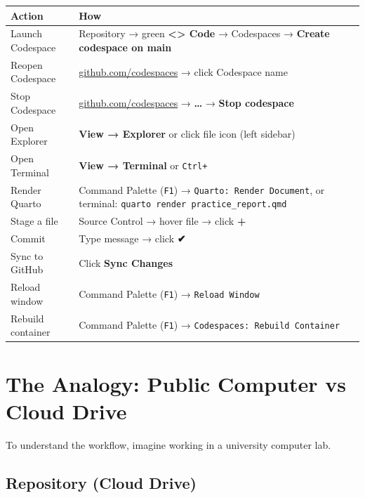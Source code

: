 \documentclass[
  letterpaper,
  DIV=11,
  numbers=noendperiod,
  oneside]{scrreprt}
\begin{document}
\begin{longtable}[]{@{}
  >{\raggedright\arraybackslash}p{}
  >{\raggedright\arraybackslash}p{}@{}}
\toprule\noalign{}
\begin{minipage}[b]{\linewidth}\raggedright
Action
\end{minipage} & \begin{minipage}[b]{\linewidth}\raggedright
How
\end{minipage} \\
\midrule\noalign{}
\endhead
\bottomrule\noalign{}
\endlastfoot
Launch Codespace & Repository → green \textbf{\textless\textgreater{}
Code} → Codespaces → \textbf{Create codespace on main} \\
Reopen Codespace &
\href{https://github.com/codespaces}{github.com/codespaces} → click
Codespace name \\
Stop Codespace &
\href{https://github.com/codespaces}{github.com/codespaces} →
\textbf{\ldots{}} → \textbf{Stop codespace} \\
Open Explorer & \textbf{View → Explorer} or click file icon (left
sidebar) \\
Open Terminal & \textbf{View → Terminal} or
\texttt{Ctrl+\textasciigrave{}} \\
Render Quarto & Command Palette (\texttt{F1}) →
\texttt{Quarto:\ Render\ Document}, or terminal:
\texttt{quarto\ render\ practice\_report.qmd} \\
Stage a file & Source Control → hover file → click \textbf{+} \\
Commit & Type message → click \textbf{✔} \\
Sync to GitHub & Click \textbf{Sync Changes} \\
Reload window & Command Palette (\texttt{F1}) →
\texttt{Reload\ Window} \\
Rebuild container & Command Palette (\texttt{F1}) →
\texttt{Codespaces:\ Rebuild\ Container} \\
\end{longtable}

\chapter{The Analogy: Public Computer vs Cloud
Drive}\label{the-analogy-public-computer-vs-cloud-drive}

To understand the workflow, imagine working in a university computer
lab.

\section{Repository (Cloud Drive)}\label{repository-cloud-drive}
\end{document}
